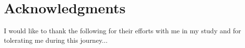 \chapter*{Acknowledgments}
\label{chap:ack}
\pagestyle{plain}

I would like to thank the following for their efforts with me in my study and for tolerating me during this journey...


